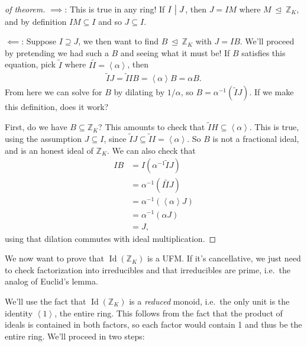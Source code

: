 \begin{proof}[of theorem]

\(\implies\): This is true in any ring! If \(I\bigm|J\), then \(J = IM\)
where \(M {~\trianglelefteq~}{\mathbb{Z}}_K\), and by definition
\(IM \subseteq I\) and so \(J \subseteq I\).

\hfill\break

\(\impliedby\): Suppose \(I \supseteq J\), we then want to find
\(B {~\trianglelefteq~}{\mathbb{Z}}_K\) with \(J = IB\). We'll proceed
by pretending we had such a \(B\) and seeing what it must be! If \(B\)
satisfies this equation, pick \(\tilde I\) where
\(I\tilde I = \left\langle{ \alpha}\right\rangle\), then
\begin{align*}
\tilde I J = \tilde I I B = \left\langle{ \alpha }\right\rangle B = \alpha B 
.\end{align*}
From here we can solve for \(B\) by dilating by \(1/ \alpha\), so
\(B = \alpha ^{-1} (\tilde I J)\). If we make this definition, does it
work?

\hfill\break

First, do we have \(B \subseteq {\mathbb{Z}}_K\)? This amounts to check
that \(\tilde I H \subseteq \left\langle{ \alpha }\right\rangle\). This
is true, using the assumption \(J \subseteq I\), since
\(\tilde I J \subseteq \tilde I I = \left\langle{ \alpha }\right\rangle\).
So \(B\) is not a fractional ideal, and is an honest ideal of
\({\mathbb{Z}}_K\). We can also check that
\begin{align*}
IB 
&= I( \alpha ^{-1} \tilde I J) \\
& = \alpha^{-1}(I \tilde I J) \\
&= \alpha^{-1}( \left\langle{ \alpha }\right\rangle J ) \\
&= \alpha ^{-1} ( \alpha J) \\
&= J
,\end{align*}
using that dilation commutes with ideal multiplication.

\end{proof}

\begin{remark}

We now want to prove that \(\operatorname{Id}({\mathbb{Z}}_K)\) is a
UFM. If it's cancellative, we just need to check factorization into
irreducibles and that irreducibles are prime, i.e.~the analog of
Euclid's lemma.

\end{remark}

\begin{remark}

We'll use the fact that \(\operatorname{Id}({\mathbb{Z}}_K)\) is a
\emph{reduced} monoid, i.e.~the only unit is the identity
\(\left\langle{ 1 }\right\rangle\), the entire ring. This follows from
the fact that the product of ideals is contained in both factors, so
each factor would contain 1 and thus be the entire ring. We'll proceed
in two steps:

\end{remark}

